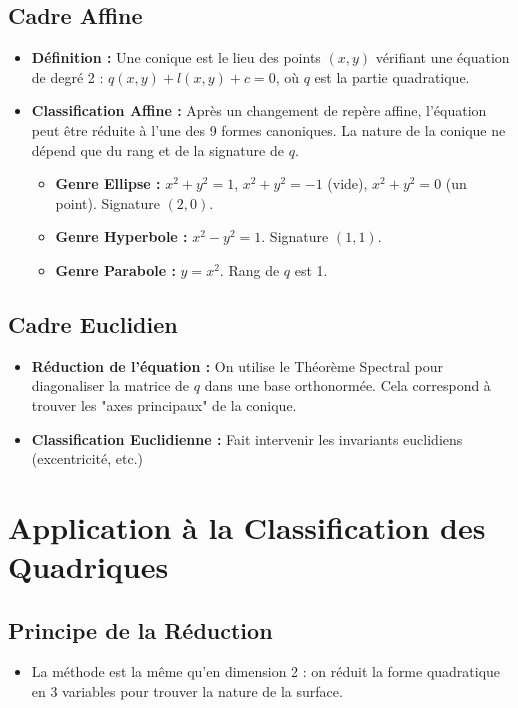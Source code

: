 \documentclass[12pt, a4paper, parskip=full]{report}
\theoremstyle{agregstyle}
\begin{document}
\subsection{Cadre Affine}
\begin{itemize}
    \item \textbf{Définition :} Une conique est le lieu des points $(x,y)$ vérifiant une équation de degré 2 : $q(x,y) + l(x,y) + c = 0$, où $q$ est la partie quadratique.
    \item \textbf{Classification Affine :} Après un changement de repère affine, l'équation peut être réduite à l'une des 9 formes canoniques. La nature de la conique ne dépend que du rang et de la signature de $q$.
        \begin{itemize}
            \item \textbf{Genre Ellipse :} $x^2+y^2=1$, $x^2+y^2=-1$ (vide), $x^2+y^2=0$ (un point). Signature $(2,0)$.
            \item \textbf{Genre Hyperbole :} $x^2-y^2=1$. Signature $(1,1)$.
            \item \textbf{Genre Parabole :} $y=x^2$. Rang de $q$ est 1.
        \end{itemize}
\end{itemize}
\subsection{Cadre Euclidien}
\begin{itemize}
    \item \textbf{Réduction de l'équation :} On utilise le Théorème Spectral pour diagonaliser la matrice de $q$ dans une base orthonormée. Cela correspond à trouver les "axes principaux" de la conique.
    \item \textbf{Classification Euclidienne :} Fait intervenir les invariants euclidiens (excentricité, etc.)
\end{itemize}

\section{Application à la Classification des Quadriques}
\subsection{Principe de la Réduction}
\begin{itemize}
    \item La méthode est la même qu'en dimension 2 : on réduit la forme quadratique en 3 variables pour trouver la nature de la surface.
\end{itemize}
\end{document}
